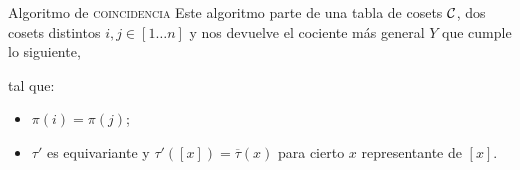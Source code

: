 \documentclass[aspectratio=169, 9pt]{beamer}
\newcommand{\rep}{\textsc{rep}}
\newcommand{\coin}{\textsc{coincidencia}}
\newcommand{\In}{[1 \dots n]}
\newcommand{\ol}{\overline}
\newcommand{\Co}{{\cal{C}}}
\begin{document}
\begin{frame}[fragile]{Algoritmo de \coin}
	Este algoritmo parte de una tabla de cosets $\Co$, dos cosets distintos $i,j \in \In$ y nos devuelve el cociente más general $Y$ que cumple lo siguiente,
		\begin{center}
					{\large {}}
		\end{center}
		tal que:
		\begin{itemize}
			\item $\pi(i) = \pi(j)$;
			\item $\tau'$ es equivariante y $\tau' ([x]) = \ol\tau(x)$ para cierto $x$ representante de  $[x]$. 
		\end{itemize}
\end{frame}
%
%	
\end{document}
